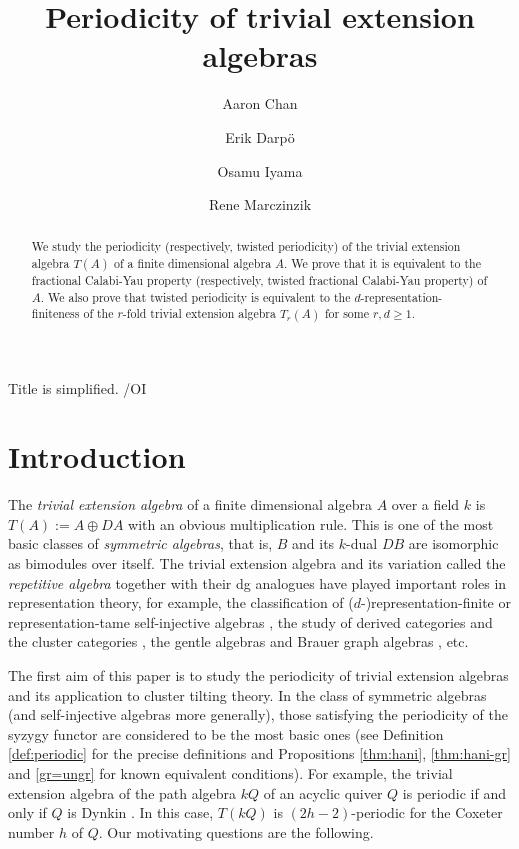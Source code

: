 \documentclass[a4paper,reqno,11pt]{amsart}
\theoremstyle{definition}
\newcommand{\new}[1]{{\blue #1}}
\renewcommand{\comment}[1]{{\color{green!50!gray} #1}}
\numberwithin{equation}{section}
\begin{document}
\title[Periodicity of trivial extension algebras]{Periodicity of trivial extension algebras}

\comment{Title is simplified. /OI}

\author[Chan]{Aaron Chan}

\author[Darp\"o]{Erik Darp\"o}

\author[Iyama]{Osamu Iyama}
\address{O. Iyama: Graduate School of Mathematics, Nagoya University, Furocho, Chikusaku, Nagoya 464-8602, Japan}

\author[Marczinzik]{Rene Marczinzik}
\maketitle 

\begin{abstract}
\new{We study the periodicity (respectively, twisted periodicity) of the trivial extension algebra $T(A)$ of a finite dimensional algebra $A$. We prove that it is equivalent to the fractional Calabi-Yau property (respectively, twisted fractional Calabi-Yau property) of $A$. We also prove that twisted periodicity is equivalent to the $d$-representation-finiteness of the $r$-fold trivial extension algebra $T_r(A)$ for some $r,d\ge1$.}
\end{abstract}

\tableofcontents


\section*{Introduction}
The \emph{trivial extension algebra} of a finite dimensional algebra $A$ over a field $k$ is $T(A):=A\oplus DA$ with an obvious multiplication rule. This is one of the most basic classes of \emph{symmetric algebras}, that is, $B$ and its $k$-dual $DB$ are isomorphic as bimodules over itself.
The trivial extension algebra and its variation called the \emph{repetitive algebra} together with their dg analogues have played important roles in representation theory, for example, the classification of ($d$-)representation-finite or representation-tame self-injective algebras \cite{T,HW,R,Sk,SY,J}, the study of derived categories \cite{Hap} and the cluster categories \cite{K,Am}, the gentle algebras \cite{AS} and Brauer graph algebras \cite{Sc}, etc.

The first aim of this paper is to study the periodicity of trivial extension algebras and its application to cluster tilting theory. In the class of symmetric algebras (and self-injective algebras more generally), those satisfying the periodicity of the syzygy functor are considered to be the most basic ones (see Definition \ref{def:periodic} for the precise definitions and Propositions \ref{thm:hani}, \ref{thm:hani-gr} and \ref{gr=ungr} for known equivalent conditions).
For example, the trivial extension algebra of the path algebra $kQ$ of an acyclic quiver $Q$ is periodic if and only if $Q$ is Dynkin \cite{BBK}. In this case, $T(kQ)$ is $(2h-2)$-periodic for the Coxeter number $h$ of $Q$.
Our motivating questions are the following.
\end{document}
